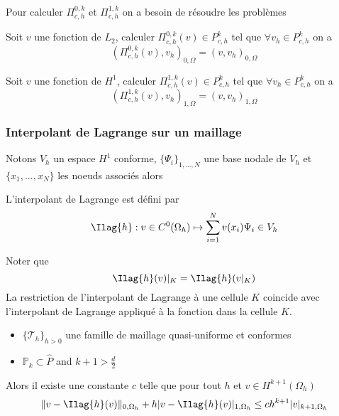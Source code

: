     Pour calculer  $\Pi^{0,k}_{c,h}$ et $\Pi^{1,k}_{c,h}$ on a besoin de
    résoudre les     problèmes
    \begin{problem}[Projection $L_2$]
      \label{prob:3}
      Soit $v$ une fonction de $L_2$, calculer $\Pi^{0,k}_{c,h}(v) \in
      P^k_{c,h}$ tel que $\forall v_h \in P^k_{c,h}$ on a
      \begin{equation}
        \label{eq:58}
        (\Pi^{0,k}_{c,h}(v), v_h)_{0,\Omega} = (v, v_h)_{0,\Omega}
      \end{equation}
\end{problem}

\begin{problem}[Projection $H^1$]
  \label{prob:4}
  Soit $v$ une fonction de $H^1$, calculer $\Pi^{1,k}_{c,h}(v) \in
  P^k_{c,h}$ tel que $\forall v_h \in P^k_{c,h}$ on a
  \begin{equation}
    \label{eq:59}
    (\Pi^{1,k}_{c,h}(v), v_h)_{1,\Omega} = (v, v_h)_{1,\Omega}
  \end{equation}
\end{problem}

\subsubsection{Interpolant de Lagrange sur un maillage}
\label{sec:lagr-interp-mesh}

Notons $V_h$ un espace $H^1$ conforme,
$\{\Psi_i\}_{1,...,N}$ une base nodale de $V_h$ et  $\{x_1,...,x_N\}$ les noeuds associés
alors
\begin{definition}
  \label{def:37}
  L'interpolant de Lagrange est défini par
  \begin{equation}
    \label{eq:60}
    \Ilag{h}: v \in C^0(\Omega_h) \mapsto \sum_{i=1}^N v(x_{i}) \Psi_i \in V_h
  \end{equation}
\end{definition}
\begin{remark}
  \label{rem:21}
  Noter que
  \begin{equation}
    \label{eq:61}
    \Ilag{h}(v)|_K = \Ilag{h}(v|_K)
  \end{equation}
  La restriction de l'interpolant de Lagrange à une cellule $K$ coincide avec
  l'interpolant de Lagrange appliqué à la fonction dans la cellule $K$.
\end{remark}



\begin{theorem}
  \label{thr:15}
  \begin{itemize}
  \item $\{\mathcal{T}_h\}_{h>0}$ une famille de maillage quasi-uniforme et conformes
  \item $\mathbb{P}_k \subset \hat{P}$ and $k+1 > \frac{d}{2}$
  \end{itemize}
  Alors il existe une constante $c$ telle que pour tout $h$ et $v \in
  H^{k+1}(\Omega_h)$
  \begin{equation}
    \label{eq:62}
    \|v - \Ilag{h}(v)\|_{0,\Omega_h} + h |v - \Ilag{h}(v)|_{1,\Omega_h} \leq
    c h^{k+1} |v|_{k+1,\Omega_h}
  \end{equation}
\end{theorem}

